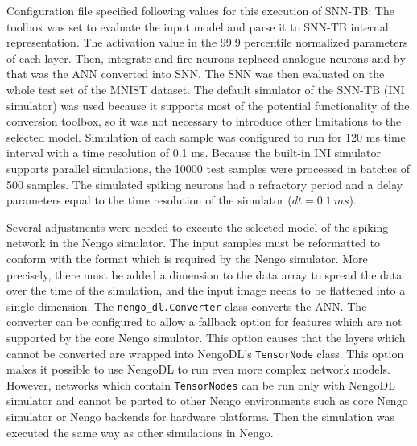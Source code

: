Configuration file specified following values for this execution of SNN-TB: The  toolbox was set to evaluate the input model and parse it to SNN-TB internal representation. The activation value in the 99.9 percentile normalized parameters of each layer. Then, integrate-and-fire neurons replaced analogue neurons and by that was the ANN converted into SNN. The SNN was then evaluated on the whole test set of the MNIST dataset. The default simulator of the SNN-TB (INI simulator) was used because it supports most of the potential functionality of the conversion toolbox, so it was not necessary to introduce other limitations to the selected model. Simulation of each sample was configured to run for 120 ms time interval with a time resolution of 0.1 ms. Because the built-in INI simulator supports parallel simulations, the 10000 test samples were processed in batches of 500 samples. The simulated spiking neurons had a refractory period and a delay parameters equal to the time resolution of the simulator ($dt=0.1~ms$).\par
Several adjustments were needed to execute the selected model of the spiking network in the Nengo simulator. The input samples must be reformatted to conform with the format which is required by the Nengo simulator. More precisely, there must be added a dimension to the data array to spread the data over the time of the simulation, and the input image needs to be flattened into a single dimension. The \texttt{nengo\_dl.Converter} class converts the ANN. The converter can be configured to allow a fallback option for features which are not supported by the core Nengo simulator. This option causes that the layers which cannot be converted are wrapped into NengoDL's \texttt{TensorNode} class. This option makes it possible to use NengoDL to run even more complex network models. However, networks which contain \texttt{TensorNodes} can be run only with NengoDL simulator and cannot be ported to other Nengo environments such as core Nengo simulator or Nengo backends for hardware platforms. Then the simulation was executed the same way as other simulations in Nengo.
